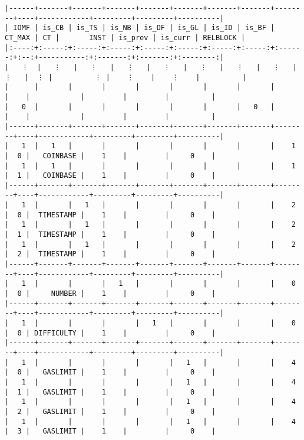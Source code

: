 \documentclass[varwidth=\maxdimen,margin=0.5cm,multi={verbatim}]{standalone}
\begin{document}
\begin{verbatim}
|------+-------+-------+-------+-------+-------+-------+-------+--------+----+------------+---------+---------+----------|
| IOMF | is_CB | is_TS | is_NB | is_DF | is_GL | is_ID | is_BF | CT_MAX | CT |       INST | is_prev | is_curr | RELBLOCK |
|:----:+:-----:+:-----:+:-----:+:-----:+:-----:+:-----:+:-----:+:------:+:--:+-----------:+:-------:+:-------:+:--------:|
|   ⋮  |   ⋮   |   ⋮   |   ⋮   |   ⋮   |   ⋮   |   ⋮   |   ⋮   |    ⋮   |  ⋮ |          ⋮ |    ⋮    |    ⋮    |          |
|      |       |       |       |       |       |       |       |        |    |            |         |         |          |
|   0  |       |       |       |       |       |       |   0   |        |    |            |         |         |          |
|------+-------+-------+-------+-------+-------+-------+-------+--------+----+------------+---------+---------+----------|
|   1  |   1   |       |       |       |       |       |       |    1   |  0 |   COINBASE |    1    |         |     0    |
|   1  |   1   |       |       |       |       |       |       |    1   |  1 |   COINBASE |    1    |         |     0    |
|------+-------+-------+-------+-------+-------+-------+-------+--------+----+------------+---------+---------+----------|
|   1  |       |   1   |       |       |       |       |       |    2   |  0 |  TIMESTAMP |    1    |         |     0    |
|   1  |       |   1   |       |       |       |       |       |    2   |  1 |  TIMESTAMP |    1    |         |     0    |
|   1  |       |   1   |       |       |       |       |       |    2   |  2 |  TIMESTAMP |    1    |         |     0    |
|------+-------+-------+-------+-------+-------+-------+-------+--------+----+------------+---------+---------+----------|
|   1  |       |       |   1   |       |       |       |       |    0   |  0 |     NUMBER |    1    |         |     0    |
|------+-------+-------+-------+-------+-------+-------+-------+--------+----+------------+---------+---------+----------|
|   1  |       |       |       |   1   |       |       |       |    0   |  0 | DIFFICULTY |    1    |         |     0    |
|------+-------+-------+-------+-------+-------+-------+-------+--------+----+------------+---------+---------+----------|
|   1  |       |       |       |       |   1   |       |       |    4   |  0 |   GASLIMIT |    1    |         |     0    |
|   1  |       |       |       |       |   1   |       |       |    4   |  1 |   GASLIMIT |    1    |         |     0    |
|   1  |       |       |       |       |   1   |       |       |    4   |  2 |   GASLIMIT |    1    |         |     0    |
|   1  |       |       |       |       |   1   |       |       |    4   |  3 |   GASLIMIT |    1    |         |     0    |

\end{verbatim}
\end{document}
